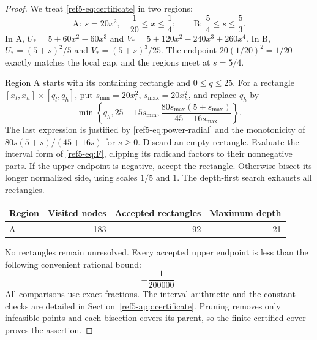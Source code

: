 \documentclass[11pt]{article}
\theoremstyle{remark}
\numberwithin{equation}{section}
\begin{document}
\begin{proof}
We treat \eqref{ref5-eq:certificate} in two regions:
\[
 \mathrm A:\ s=20x^2,\quad\frac1{20}\le x\le\frac14;
 \qquad
 \mathrm B:\ \frac54\le s\le\frac53.
\]
In A, $U_*=5+60x^2-60x^3$ and
$V_*=5+120x^2-240x^3+260x^4$.
In B, $U_*=(5+s)^2/5$ and $V_*=(5+s)^3/25$.
The endpoint $20(1/20)^2=1/20$ exactly matches the local gap,
and the regions meet at $s=5/4$.

Region A starts with its containing rectangle and $0\le q\le25$.
For a rectangle $[x_l,x_h]\times[q_l,q_h]$, put
$s_{\min}=20x_l^2$, $s_{\max}=20x_h^2$, and replace $q_h$ by
\[
 \min\left\{q_h,25-15s_{\min},
            \frac{80s_{\max}(5+s_{\max})}{45+16s_{\max}}\right\}.
\]
The last expression is justified by \eqref{ref5-eq:power-radial} and the
monotonicity of $80s(5+s)/(45+16s)$ for $s\ge0$.
Discard an empty rectangle. Evaluate the interval form of
\eqref{ref5-eq:F}, clipping its radicand factors to their nonnegative parts.
If the upper endpoint is negative, accept the rectangle.
Otherwise bisect its longer normalized side, using scales $1/5$ and
$1$. The depth-first search exhausts all rectangles.

\begin{center}
\begin{tabular}{lrrr}
\toprule
Region & Visited nodes & Accepted rectangles & Maximum depth\\
\midrule
A & 183 & 92 & 21\\
\bottomrule
\end{tabular}
\end{center}
No rectangles remain unresolved. Every accepted upper endpoint is less
than the following convenient rational bound:
\begin{equation}\label{ref5-eq:certificate-margins}
 -\frac1{200000}.
\end{equation}
All comparisons use exact fractions. The interval arithmetic and the
constant checks are detailed in Section~\ref{ref5-app:certificate}.
Pruning removes only infeasible points and each bisection covers its
parent, so the finite certified cover proves the assertion.


\end{proof}
\end{document}
